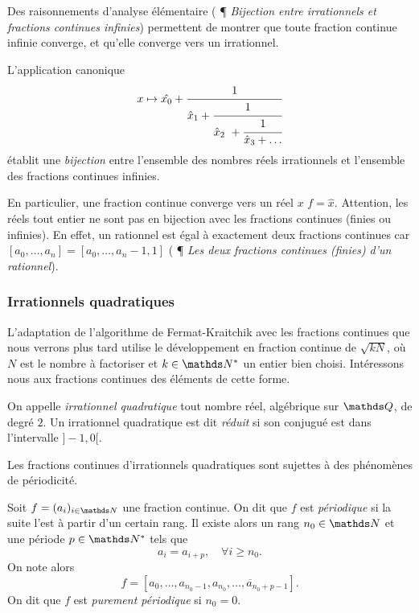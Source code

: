 Des raisonnements d'analyse élémentaire (\cite{wikiu} ¶ \emph{Bijection entre
irrationnels et fractions continues infinies}) permettent de montrer que toute
fraction continue infinie converge, et qu'elle converge vers un irrationnel.

\begin{theoreme}
	L'application canonique \[x \mapsto \hat{x_0} + \cfrac{1}{\hat{x}_1 +
	\cfrac{1}{\hat{x}_2 + \cfrac{1}{\hat{x}_3 + \dots}}}\] établit une
	\emph{bijection} entre l'ensemble des nombres réels irrationnels et
	l'ensemble des fractions continues infinies.
\end{theoreme}

En particulier, une fraction continue converge vers un réel $x$ \ssi
$f=\hat{x}$. Attention, les réels tout entier ne sont pas en bijection avec les
fractions continues (finies ou infinies). En effet, un rationnel est égal à
exactement deux fractions continues car $[a_0, \dots, a_n] = [a_0, \dots, a_n -
1, 1]$ (\cite{wikiu} ¶ \emph{Les deux fractions continues (finies) d'un
rationnel}).

\subsubsection{Irrationnels quadratiques}
\label{ss-irrquad}

L'adaptation de l'algorithme de Fermat-Kraitchik avec les fractions continues
que nous verrons plus tard utilise le développement en fraction continue de
$\sqrt{kN}$, où $N$ est le nombre à factoriser et $k\in \N^*$ un entier bien
choisi. Intéressons nous aux fractions continues des éléments de cette forme.

\begin{definition}
	On appelle \emph{irrationnel quadratique} tout nombre réel, algébrique sur
	$\Q$, de degré $2$. Un irrationnel quadratique est dit \emph{réduit} si son
	conjugué est dans l'intervalle $]-1, 0[$.
\end{definition}

Les fractions continues d'irrationnels quadratiques sont sujettes à des
phénomènes de périodicité.

\begin{definition}
	Soit $f = (a_i)_{i\in \N}$ une fraction continue. On dit que $f$ est
	\emph{périodique} si la suite l'est à partir d'un certain rang. Il existe
	alors un rang $n_0\in \N$ et une période $p\in \N^*$ tels que \[a_{i} =
	a_{i+p}, \quad \forall i\geq n_0.\] On note alors \[f = [a_0, \dots, a_{n_0
	- 1}, \overline{a_{n_0}, \dots, a_{n_0 + p -1}}].\] On dit que $f$ est
	\emph{purement périodique} si $n_0 = 0$.
\end{definition}


